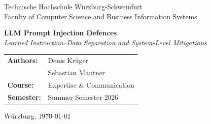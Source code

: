 \begin{titlepage}
    \centering
    \vspace*{2cm}

    {\large Technische Hochschule Würzburg-Schweinfurt}\\[0.4cm]
    {\large Faculty of Computer Science and Business Information Systems}\\
    \vspace{2cm}

    {\Huge \textbf{LLM Prompt Injection Defences}}\\[1cm]
    {\large \textit{Learned Instruction--Data Separation and System-Level Mitigations}}

    \vspace{2cm}

    \begin{tabular}{ll}
        \textbf{Authors:}  & Denis Krüger \\
                           & Sebastian Mautner \\[0.5cm]
        \textbf{Course:}   & Expertise \& Communication \\
        \textbf{Semester:} & Summer Semester 2026 \\
    \end{tabular}

    \vfill

    {\small Würzburg, \today}
\end{titlepage}
